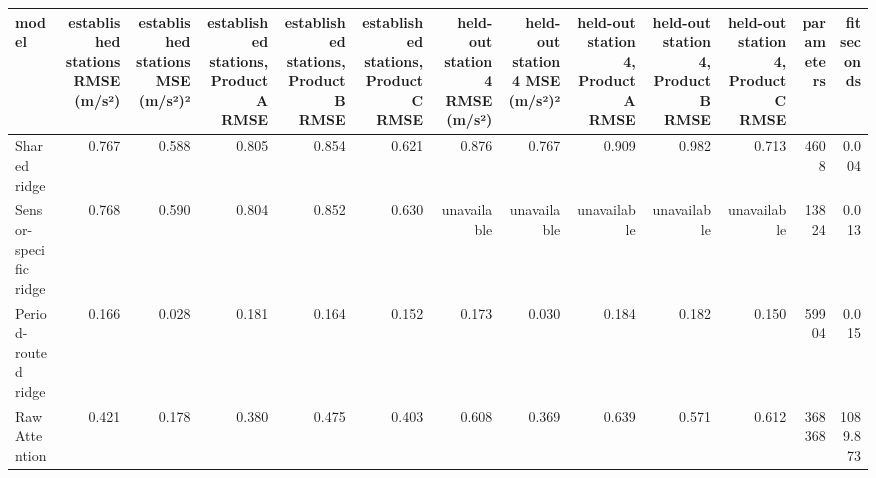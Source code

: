 \begin{tabular}{lrrrrrrrrrrrr}
\toprule
model & established stations RMSE (m/s²) & established stations MSE (m/s²)² & established stations, Product A RMSE & established stations, Product B RMSE & established stations, Product C RMSE & held-out station 4 RMSE (m/s²) & held-out station 4 MSE (m/s²)² & held-out station 4, Product A RMSE & held-out station 4, Product B RMSE & held-out station 4, Product C RMSE & parameters & fit seconds \\
\midrule
Shared ridge & 0.767 & 0.588 & 0.805 & 0.854 & 0.621 & 0.876 & 0.767 & 0.909 & 0.982 & 0.713 & 4608 & 0.004 \\
Sensor-specific ridge & 0.768 & 0.590 & 0.804 & 0.852 & 0.630 & unavailable & unavailable & unavailable & unavailable & unavailable & 13824 & 0.013 \\
Period-routed ridge & 0.166 & 0.028 & 0.181 & 0.164 & 0.152 & 0.173 & 0.030 & 0.184 & 0.182 & 0.150 & 59904 & 0.015 \\
Raw Attention & 0.421 & 0.178 & 0.380 & 0.475 & 0.403 & 0.608 & 0.369 & 0.639 & 0.571 & 0.612 & 368368 & 1089.873 \\
\bottomrule
\end{tabular}
